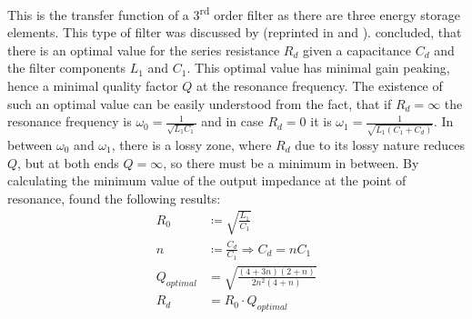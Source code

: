 This is the transfer function of a 3\textsuperscript{rd} order filter as there are three energy storage elements. This type of filter was discussed by \citeauthor{input_filter_middlebrook_solution} \cite{input_filter_middlebrook_solution} (reprinted in \cite{input_filter_middlebrook_reprint1} and \cite{input_filter_middlebrook_reprint2}). \citeauthor{input_filter_middlebrook_solution} concluded, that there is an optimal value for the series resistance $R_d$ given a capacitance $C_d$ and the filter components $L_1$ and $C_1$. This optimal value has minimal gain peaking, hence a minimal quality factor $Q$ at the resonance frequency. The existence of such an optimal value can be easily understood from the fact, that if $R_d = \infty$ the resonance frequency is $\omega_0 = \frac{1}{\sqrt{L_1 C_1}}$ and in case $R_d = 0$ it is $\omega_1 = \frac{1}{\sqrt{L_1 \left(C_1 + C_d\right)}}$. In between $\omega_0$ and $\omega_1$, there is a lossy zone, where $R_d$ due to its lossy nature reduces $Q$, but at both ends $Q = \infty$, so there must be a minimum in between. By calculating the minimum value of the output impedance at the point of resonance, \citeauthor{input_filter_middlebrook_solution} \cite{input_filter_middlebrook_solution} found the following results:
\begin{align}
    R_0 &\coloneqq \sqrt{\frac{L_1}{C_1}}\\
    n &\coloneqq \frac{C_d}{C_1} \Rightarrow C_d = n C_1 \label{eqn:lc_filter_cd}\\
    Q_{optimal} &= \sqrt{\frac{(4+3 n) (2+n)}{2 n^2 (4+n)}}\\
    R_d &= R_0 \cdot Q_{optimal} \label{eqn:lc_filter_rd}
\end{align}

